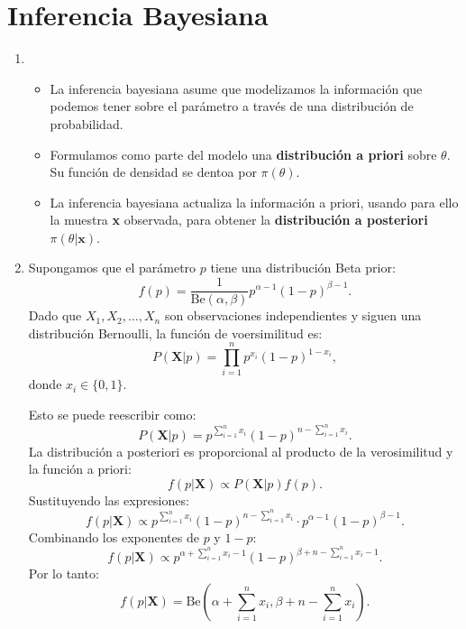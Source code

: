 \section{Inferencia Bayesiana}
\begin{enumerate}[label=\color{red}\textbf{\arabic*)}]
  \item {}
    \begin{itemize}[label=\textbullet]
      \item La inferencia bayesiana asume que modelizamos la información que podemos tener sobre el parámetro a través de una distribución de probabilidad.
      \item Formulamos como parte del modelo una \textbf{distribución a priori} sobre $\theta$. Su función de densidad se dentoa por  $\pi(\theta)$.
    \item La inferencia bayesiana actualiza la información a priori, usando para ello la muestra \textbf{x} observada, para obtener la \textbf{distribución a posteriori} $\pi(\theta|\mathbf{x})$.
    \end{itemize}
  \item {} 

    Supongamos que el parámetro $p$ tiene una distribución Beta prior:  \[
    f(p)=\dfrac{1}{\mathrm{Be}(\alpha,\beta)}p^{\alpha-1}(1-p)^{\beta-1}.
    \] 
    Dado que $X_1,X_2,\dots,X_n$ son observaciones independientes y siguen una distribución Bernoulli, la función de voersimilitud es: \[
      P(\mathbf{X}|p)=\prod_{i=1}^{n}p^{x_i}(1-p)^{1-x_i},
    \]  donde $x_i\in \{0,1\} $.

    Esto se puede reescribir como: \[
    P(\mathbf{X}|p)=p^{\sum_{i=1}^{n} x_i}(1-p)^{n-\sum_{i=1}^{n} x_i}.
    \] 
    La distribución a posteriori es proporcional al producto de la verosimilitud y la función a priori: \[
    f(p|\mathbf{X})\propto P(\mathbf{X}|p)f(p).
    \] 
    Sustituyendo las expresiones: \[
    f(p|\mathbf{X})\propto p^{\sum_{i=1}^{n} x_i}(1-p)^{n-\sum_{i=1}^{n} x_i}\cdot p^{\alpha-1}(1-p)^{\beta-1}.
    \] 
    Combinando los exponentes de $p$ y  $1-p$:  \[
    f(p|\mathbf{X})\propto p^{\alpha+\sum_{i=1}^{n} x_i-1}(1-p)^{\beta+n-\sum_{i=1}^{n} x_i-1}.
    \] 
    Por lo tanto: \[
      f(p|\mathbf{X})=\mathrm{Be}\left( \alpha+\sum_{i=1}^{n} x_i,\beta+n-\sum_{i=1}^{n} x_i \right) .
    \] 
\end{enumerate}

